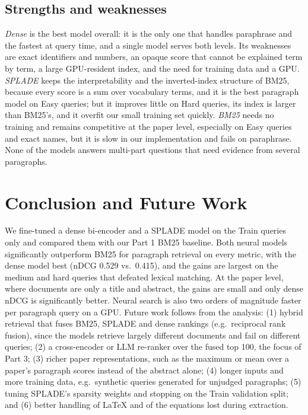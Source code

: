 \documentclass[sigconf,nonacm]{acmart}
\begin{document}
\subsection{Strengths and weaknesses}
\emph{Dense} is the best model overall: it is the only one that handles paraphrase and the fastest at query time, and a single model serves both levels. Its weaknesses are exact identifiers and numbers, an opaque score that cannot be explained term by term, a large GPU-resident index, and the need for training data and a GPU. \emph{SPLADE} keeps the interpretability and the inverted-index structure of BM25, because every score is a sum over vocabulary terms, and it is the best paragraph model on Easy queries; but it improves little on Hard queries, its index is larger than BM25's, and it overfit our small training set quickly. \emph{BM25} needs no training and remains competitive at the paper level, especially on Easy queries and exact names, but it is slow in our implementation and fails on paraphrase. None of the models answers multi-part questions that need evidence from several paragraphs.

\section{Conclusion and Future Work}
We fine-tuned a dense bi-encoder and a SPLADE model on the Train queries only and compared them with our Part 1 BM25 baseline. Both neural models significantly outperform BM25 for paragraph retrieval on every metric, with the dense model best (nDCG 0.529 vs.\ 0.415), and the gains are largest on the medium and hard queries that defeated lexical matching. At the paper level, where documents are only a title and abstract, the gains are small and only dense nDCG is significantly better. Neural search is also two orders of magnitude faster per paragraph query on a GPU. Future work follows from the analysis: (1) hybrid retrieval that fuses BM25, SPLADE and dense rankings (e.g.\ reciprocal rank fusion), since the models retrieve largely different documents and fail on different queries; (2) a cross-encoder or LLM re-ranker over the fused top 100, the focus of Part 3; (3) richer paper representations, such as the maximum or mean over a paper's paragraph scores instead of the abstract alone; (4) longer inputs and more training data, e.g.\ synthetic queries generated for unjudged paragraphs; (5) tuning SPLADE's sparsity weights and stopping on the Train validation split; and (6) better handling of LaTeX and of the equations lost during extraction.
\end{document}
